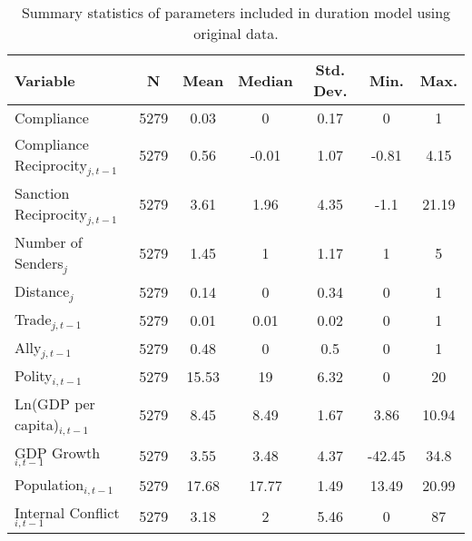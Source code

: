 \begin{table}[ht]
\centering
{\normalsize
\begin{tabular}{lcccccc}
 Variable & N & Mean & Median & Std. Dev. & Min. & Max. \\ 
  \hline
\hline
Compliance & 5279 & 0.03 & 0 & 0.17 & 0 & 1 \\ 
  Compliance Reciprocity$_{j,t-1}$ & 5279 & 0.56 & -0.01 & 1.07 & -0.81 & 4.15 \\ 
  Sanction Reciprocity$_{j,t-1}$ & 5279 & 3.61 & 1.96 & 4.35 & -1.1 & 21.19 \\ 
  Number of Senders$_{j}$ & 5279 & 1.45 & 1 & 1.17 & 1 & 5 \\ 
  Distance$_{j}$ & 5279 & 0.14 & 0 & 0.34 & 0 & 1 \\ 
  Trade$_{j,t-1}$ & 5279 & 0.01 & 0.01 & 0.02 & 0 & 1 \\ 
  Ally$_{j,t-1}$ & 5279 & 0.48 & 0 & 0.5 & 0 & 1 \\ 
  Polity$_{i,t-1}$ & 5279 & 15.53 & 19 & 6.32 & 0 & 20 \\ 
  Ln(GDP per capita)$_{i,t-1}$ & 5279 & 8.45 & 8.49 & 1.67 & 3.86 & 10.94 \\ 
  GDP Growth$_{i,t-1}$ & 5279 & 3.55 & 3.48 & 4.37 & -42.45 & 34.8 \\ 
  Population$_{i,t-1}$ & 5279 & 17.68 & 17.77 & 1.49 & 13.49 & 20.99 \\ 
  Internal Conflict$_{i,t-1}$ & 5279 & 3.18 & 2 & 5.46 & 0 & 87 \\ 
   \hline
\hline
\end{tabular}
}
\caption{Summary statistics of parameters included in duration model using original data.} 
\label{tab:summNoImp}
\end{table}
